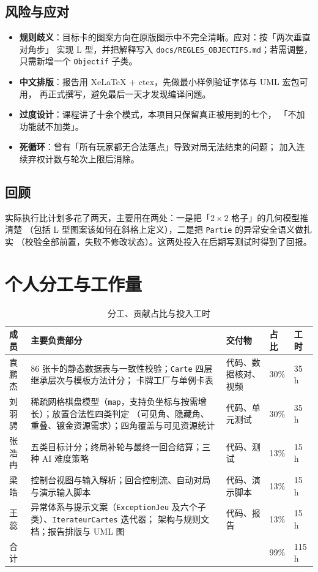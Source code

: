 \documentclass[11pt,a4paper]{ctexart}
\newcommand{\cl}[1]{\texttt{#1}}
\begin{document}
\subsection{风险与应对}
\begin{itemize}
\item \textbf{规则歧义}：目标卡的图案方向在原版图示中不完全清晰。应对：按「两次垂直对角步」
      实现 L 型，并把解释写入 \cl{docs/REGLES\_OBJECTIFS.md}；若需调整，只需新增一个
      \cl{Objectif} 子类。
\item \textbf{中文排版}：报告用 XeLaTeX + ctex，先做最小样例验证字体与 UML 宏包可用，
      再正式撰写，避免最后一天才发现编译问题。
\item \textbf{过度设计}：课程讲了十余个模式，本项目只保留真正被用到的七个，
      「不加功能就不加类」。
\item \textbf{死循环}：曾有「所有玩家都无合法落点」导致对局无法结束的问题；
      加入连续弃权计数与轮次上限后消除。
\end{itemize}

\subsection{回顾}
实际执行比计划多花了两天，主要用在两处：一是把「$2\times2$ 格子」的几何模型推清楚
（包括 L 型图案该如何在斜格上定义），二是把 \cl{Partie} 的异常安全语义做扎实
（校验全部前置，失败不修改状态）。这两处投入在后期写测试时得到了回报。

\section{个人分工与工作量}
\begin{table}[h]
\centering
\small
\setlength{\tabcolsep}{4.5pt}
\begin{tabular}{p{2.2cm}p{6.6cm}p{3.0cm}p{1.4cm}p{1.3cm}}
\toprule
成员 & 主要负责部分 & 交付物 & 占比 & 工时 \\
\midrule
袁鹏杰 & 86 张卡的静态数据表与一致性校验；\cl{Carte} 四层继承层次与模板方法计分；
         卡牌工厂与单例卡表 & 代码、数据核对、视频 & 30\% & 35 h \\
刘羽骋 & 稀疏网格棋盘模型（\cl{map}，支持负坐标与按需增长）；放置合法性四类判定
         （可见角、隐藏角、重叠、镀金资源需求）；四角覆盖与可见资源统计 & 代码、单元测试 & 30\% & 35 h \\
张浩冉 & 五类目标计分；终局补轮与最终一回合结算；三种 AI 难度策略 & 代码、测试 & 13\% & 15 h \\
梁皓 & 控制台视图与输入解析；回合控制流、自动对局与演示输入脚本 & 代码、演示脚本 & 13\% & 15 h \\
王蕊 & 异常体系与提示文案（\cl{ExceptionJeu} 及六个子类）、\cl{IterateurCartes} 迭代器；
         架构与规则文档；报告排版与 UML 图 & 代码、报告 & 13\% & 15 h \\
\midrule
合计 & \strut & \strut & 99\% & 115 h \\
\bottomrule
\end{tabular}
\caption{分工、贡献占比与投入工时}
\label{tab:contrib}
\end{table}
\end{document}
